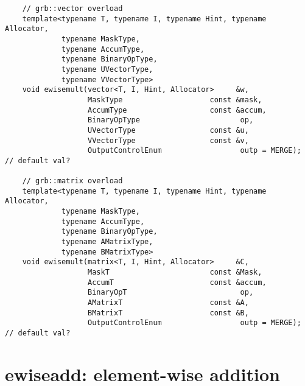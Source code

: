 \begin{verbatim}
    // grb::vector overload
    template<typename T, typename I, typename Hint, typename Allocator,
             typename MaskType,
             typename AccumType,
             typename BinaryOpType,
             typename UVectorType,
             typename VVectorType>
    void ewisemult(vector<T, I, Hint, Allocator>     &w,
                   MaskType                    const &mask,
                   AccumType                   const &accum,
                   BinaryOpType                       op,
                   UVectorType                 const &u,
                   VVectorType                 const &v,
                   OutputControlEnum                  outp = MERGE);  // default val?

    // grb::matrix overload
    template<typename T, typename I, typename Hint, typename Allocator,
             typename MaskType,
             typename AccumType,
             typename BinaryOpType,
             typename AMatrixType,
             typename BMatrixType>
    void ewisemult(matrix<T, I, Hint, Allocator>     &C,
                   MaskT                       const &Mask,
                   AccumT                      const &accum,
                   BinaryOpT                          op,
                   AMatrixT                    const &A,
                   BMatrixT                    const &B,
                   OutputControlEnum                  outp = MERGE);  // default val?
\end{verbatim}


\section{{\sf ewiseadd}: element-wise addition}

\paragraph{\syntax}

